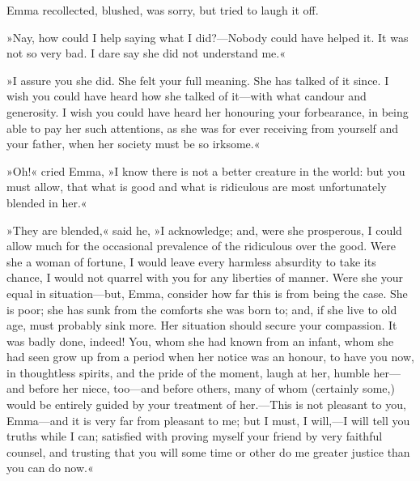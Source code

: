 Emma recollected, blushed, was sorry, but tried to laugh it off.

»Nay, how could I help saying what I did?—Nobody could have helped it. It was not so very bad. I dare say she did not understand me.«

»I assure you she did. She felt your full meaning. She has talked of it since. I wish you could have heard how she talked of it—with what candour and generosity. I wish you could have heard her honouring your forbearance, in being able to pay her such attentions, as she was for ever receiving from yourself and your father, when her society must be so irksome.«

»Oh!« cried Emma, »I know there is not a better creature in the world: but you must allow, that what is good and what is ridiculous are most unfortunately blended in her.«

»They are blended,« said he, »I acknowledge; and, were she prosperous, I could allow much for the occasional prevalence of the ridiculous over the good. Were she a woman of fortune, I would leave every harmless absurdity to take its chance, I would not quarrel with you for any liberties of manner. Were she your equal in situation—but, Emma, consider how far this is from being the case. She is poor; she has sunk from the comforts she was born to; and, if she live to old age, must probably sink more. Her situation should secure your compassion. It was badly done, indeed! You, whom she had known from an infant, whom she had seen grow up from a period when her notice was an honour, to have you now, in thoughtless spirits, and the pride of the moment, laugh at her, humble her—and before her niece, too—and before others, many of whom (certainly some,) would be entirely guided by your treatment of her.—This is not pleasant to you, Emma—and it is very far from pleasant to me; but I must, I will,—I will tell you truths while I can; satisfied with proving myself your friend by very faithful counsel, and trusting that you will some time or other do me greater justice than you can do now.«

